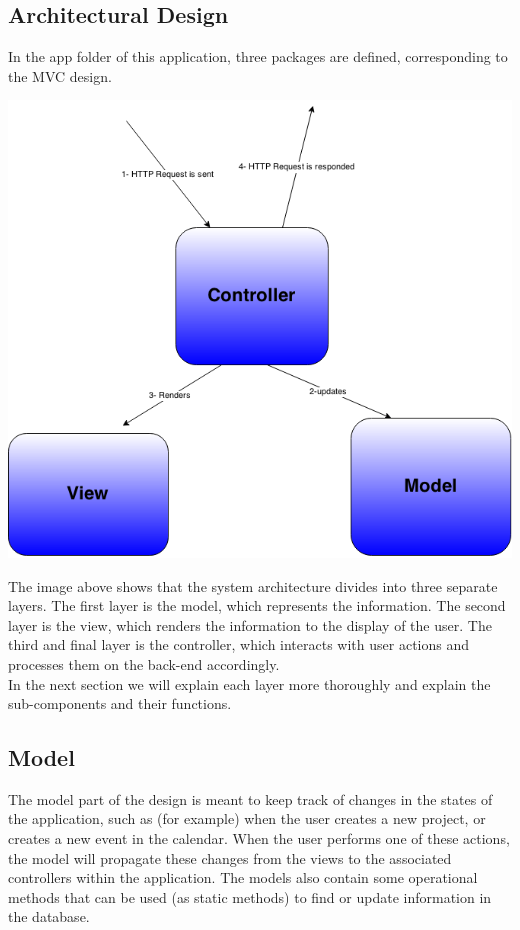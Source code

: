 \subsection{Architectural Design} %
\label{sub:arichtectural_design}
%

In the app folder of this application, three packages are defined, corresponding to the MVC design. 
\begin{center}
\includegraphics[scale=0.3]{./img/dsgn_img/MVCdiag.png}
	
\end{center}

The image above shows that the system architecture divides into three separate layers. The first layer is the model, which represents the information. 
The second layer is the view, which renders the information to the display of the user. The third and final layer is the controller, which interacts 
with user actions and processes them on the back-end accordingly. \\
In the next section we will explain each layer more thoroughly and explain the sub-components and their functions. 

\subsection{Model} %
\label{sub:design_rationale}
The model part of the design is meant to keep track of changes in the states of the application, such as (for example) when the user creates a new
project, or creates a new event in the calendar. When the user performs one of these actions, the model will propagate these changes from the 
views to the associated controllers within the application. The models also contain some operational methods that can be used (as static methods) to 
find or update information in the database.
\newpage
